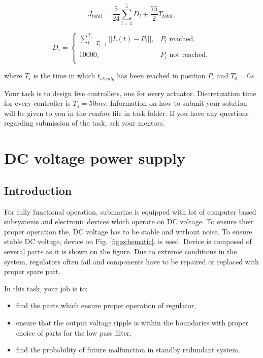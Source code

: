 \documentclass{article}
\begin{document}
	\begin{equation} \label{eq:total_cost}
	J_{total} = \frac{5}{24}\sum_{i=1}^{5} D_i + \frac{75}{2} T_{total},
	\end{equation}
	
	\begin{equation} \label{eq:distance_cost}
	D_i = \left\{
	\begin{array}{ll}
	\sum_{t=T_{i-1}}^{T_{i}} ||L(t) - P_i||, &  P_i \textrm{ reached}, \\
	& \\
	10000, &  P_i \textrm{ not reached},\\
	\end{array} 
	\right.
	\end{equation}
	
	\noindent
	where $T_i$ is the time in which $t_{steady}$ has been reached in position $P_i$ and $T_0 = 0s$.
	
	\vspace{10pt}
	\noindent
	Your task is to design five controllers, one for every actuator. 
	Discretization time for every controller is $T_s = 50ms$. Information on 
	how to submit your solution will be given to you in the \textit{readme} 
	file in task folder. If you have any questions regarding submission of the 
	task, ask your mentors.
	
	
	


\section{DC voltage power supply}

\subsection{Introduction}

For fully functional operation, submarine is equipped with 
lot of computer based subsystems and electronic devices which operate on DC 
voltage. To ensure their proper operation the, DC voltage has to be stable and 
without noise. To ensure stable DC voltage, device on Fig. 
\ref{fig:schematic}. is used. Device is composed of several parts as it is 
shown on the figure. Due to extreme conditions in the system, regulators often 
fail and components have to be repaired or replaced with proper spare part.

In this task, your job is to:
\begin{itemize}
	\item find the parts which ensure proper operation of regulator, 
	\item ensure that the output voltage ripple is within the boundaries with 
	proper choice of parts for the low pass filter,
	\item find the probability of future malfunction in standby redundant 
	system.
\end{itemize}
\end{document}
